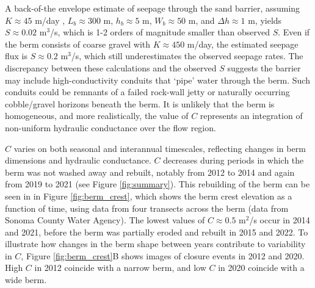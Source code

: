 \documentclass[preprint,12pt,authoryear]{elsarticle}
\begin{document}
A back-of-the envelope estimate of seepage through the  sand barrier, assuming $K \approx 45$ m/day \citep[sand,][]{masters1991introduction}, $L_b \approx 300$ m, $h_b \approx 5$ m, $W_b \approx 50$ m, and $\Delta h \approx 1$ m, yields $S \approx 0.02$ m$^3$/s, which is 1-2 orders of magnitude smaller than observed $S$.  Even if the berm consists of coarse gravel with $K \approx 450$ m/day, the estimated seepage flux is  $S \approx 0.2$ m$^3$/s, which still underestimates the observed seepage rates.
The discrepancy between these calculations and the observed $S$ suggests the barrier may include high-conductivity conduits that `pipe' water through the berm.
Such conduits could be remnants of a failed rock-wall jetty \citep{behrens2009characterization} or naturally occurring cobble/gravel horizons beneath the berm.  It is unlikely that the berm is homogeneous, and more realistically, the value of $C$ represents an integration of non-uniform hydraulic conductance over the flow region. 

 $C$ varies on both seasonal and interannual timescales, reflecting changes in berm dimensions and hydraulic conductance.
$C$ decreases during periods in which the berm was not washed away and rebuilt, notably from 2012 to 2014 and again from 2019 to 2021 (see Figure \ref{fig:summary}).  This rebuilding of the berm can be seen in in Figure \ref{fig:berm_crest}, which shows the berm crest elevation as a function of time, using data from four transects across the berm (data from Sonoma County Water Agency).  The lowest values of $C \approx0.5$ m$^2$/s occur in 2014 and 2021, before the berm was partially eroded and rebuilt in 2015 and 2022.
To illustrate how changes in the berm shape between years  contribute to variability in $C$,  Figure \ref{fig:berm_crest}B shows images of closure events in 2012 and 2020.  High $C$ in 2012 coincide with a narrow berm, and low $C$ in 2020 coincide with a wide berm. 
 
\end{document}
